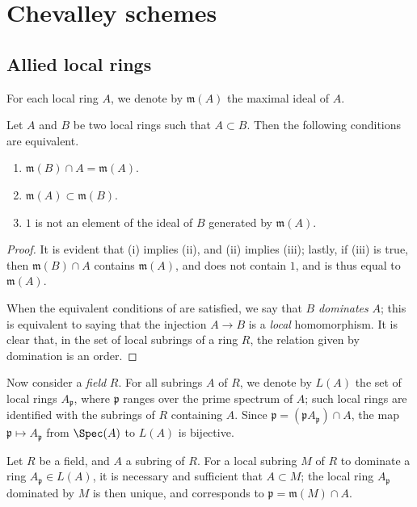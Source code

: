 \section{Chevalley schemes}
\label{section:I.8}

\subsection{Allied local rings}
\label{subsection:I.8.1}

For each local ring $A$, we denote by $\mathfrak{m}(A)$ the maximal ideal of $A$.
\begin{lemma}[8.1.1]
\label{I.8.1.1}
Let $A$ and $B$ be two local rings such that $A\subset B$.
Then the following conditions are equivalent.
\begin{enumerate}
  \item[{\rm(i)}] $\mathfrak{m}(B)\cap A=\mathfrak{m}(A)$.
  \item[{\rm(ii)}] $\mathfrak{m}(A)\subset\mathfrak{m}(B)$.
  \item[{\rm(iii)}] $1$ is not an element of the ideal of $B$ generated by $\mathfrak{m}(A)$.
\end{enumerate}
\end{lemma}

\begin{proof}
It is evident that (i) implies (ii), and (ii) implies (iii);
lastly, if (iii) is true, then $\mathfrak{m}(B)\cap A$ contains $\mathfrak{m}(A)$, and does not contain $1$, and is thus equal to $\mathfrak{m}(A)$.

When the equivalent conditions of  are satisfied, we say that $B$ \emph{dominates} $A$;
this is equivalent to saying that the injection $A\to B$ is a \emph{local} homomorphism.
It is clear that, in the set of local subrings of a ring $R$, the relation given by domination is an order.
\end{proof}

\begin{env}[8.1.2]
\label{I.8.1.2}
Now consider a \emph{field} $R$.
For all subrings $A$ of $R$, we denote by $L(A)$ the set of local rings $A_\mathfrak{p}$, where $\mathfrak{p}$ ranges over the prime spectrum of $A$;
such local rings are identified with the subrings of $R$ containing $A$.
Since $\mathfrak{p}=(\mathfrak{p}A_\mathfrak{p})\cap A$, the map $\mathfrak{p}\mapsto A_\mathfrak{p}$ from $\Spec(A)$ to $L(A)$ is bijective.
\end{env}

\begin{lemma}[8.1.3]
\label{I.8.1.3}
Let $R$ be a field, and $A$ a subring of $R$.
For a local subring $M$ of $R$ to dominate a ring $A_\mathfrak{p}\in L(A)$, it is necessary and sufficient that $A\subset M$;
the local ring $A_\mathfrak{p}$ dominated by $M$ is then unique, and corresponds to $\mathfrak{p}=\mathfrak{m}(M)\cap A$.
\end{lemma}


